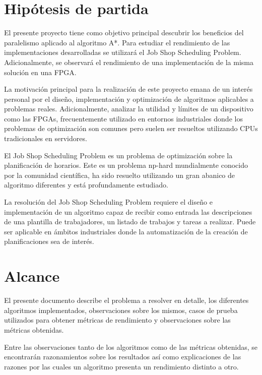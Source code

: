 
\section{Hipótesis de partida}

El presente proyecto tiene como objetivo principal descubrir los
beneficios del paralelismo aplicado al algoritmo A*.
Para estudiar el rendimiento de las implementaciones desarrolladas
se utilizará el Job Shop Scheduling Problem.
Adicionalmente, se observará el rendimiento de una implementación
de la misma solución en una FPGA.

La motivación principal para la realización de este proyecto
emana de un interés personal por el diseño, implementación y optimización
de algoritmos aplicables a problemas reales.
Adicionalmente, analizar la utilidad y límites de un dispositivo como
las FPGAs, frecuentemente utilizado
en entornos industriales donde los problemas
de optimización son comunes pero suelen ser resueltos utilizando
CPUs tradicionales en servidores.

El Job Shop Scheduling Problem es un problema de optimización
sobre la planificación de horarios.
Este es un problema np-hard mundialmente conocido
por la comunidad científica,
ha sido resuelto utilizando un gran abanico de algoritmo diferentes
y está profundamente estudiado.

La resolución del Job Shop Scheduling Problem requiere el diseño e implementación de
un algoritmo capaz de recibir como entrada las descripciones de una plantilla
de trabajadores, un listado de trabajos y tareas a realizar. Puede ser
aplicable en ámbitos industriales donde la automatización de la creación
de planificaciones sea de interés.

\pagebreak

\section{Alcance}

El presente documento describe el problema a resolver en detalle,
los diferentes algoritmos implementados,
observaciones sobre los mismos,
casos de prueba utilizados para obtener métricas de rendimiento
y observaciones sobre las métricas obtenidas.

Entre las observaciones tanto de los algoritmos como de las métricas
obtenidas, se encontrarán razonamientos sobre los resultados así
como explicaciones de las razones por las cuales un algoritmo
presenta un rendimiento distinto a otro.

